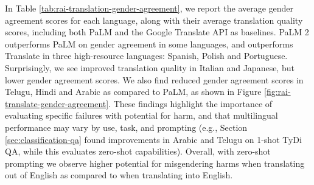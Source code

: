 In Table \ref{tab:rai-translation-gender-agreement}, we report the average gender agreement scores for each language, along with their average translation quality scores, including both PaLM and the Google Translate API as baselines.  PaLM 2 outperforms PaLM on gender agreement in some languages, and outperforms Translate in three high-resource languages: Spanish, Polish and Portuguese.  Surprisingly, we see improved translation quality in Italian and Japanese, but lower gender agreement scores. We also find reduced gender agreement scores in Telugu, Hindi and Arabic as compared to PaLM, as shown in Figure \ref{fig:rai-translate-gender-agreement}.  These findings highlight the importance of evaluating specific failures with potential for harm, and that multilingual performance may vary by use, task, and prompting (e.g., Section \ref{sec:classification-qa} found improvements in Arabic and Telugu on 1-shot TyDi QA, while this evaluates zero-shot capabilities).  Overall, with zero-shot prompting we observe higher potential for misgendering harms when translating out of English as compared to when translating into English.


